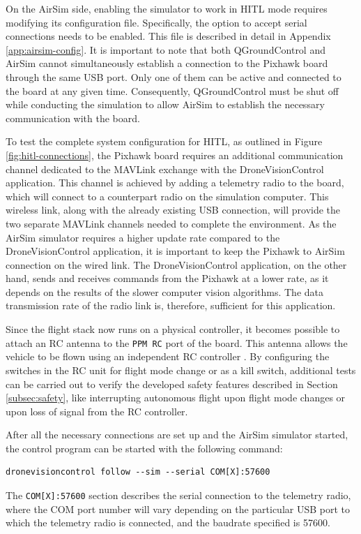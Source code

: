 On the AirSim side, enabling the simulator to work in HITL mode requires modifying its configuration file. Specifically, the option to accept serial connections needs to be enabled. This file is described in detail in Appendix \ref{app:airsim-config}.
It is important to note that both QGroundControl and AirSim cannot simultaneously establish a connection to the Pixhawk board through the same USB port. Only one of them can be active and connected to the board at any given time. Consequently, QGroundControl must be shut off while conducting the simulation to allow AirSim to establish the necessary communication with the board.


To test the complete system configuration for HITL, as outlined in Figure \ref{fig:hitl-connections}, the Pixhawk board requires an additional communication channel dedicated to the MAVLink exchange with the DroneVisionControl application. This channel is achieved by adding a telemetry radio to the board, which will connect to a counterpart radio on the simulation computer. This wireless link, along with the already existing USB connection, will provide the two separate MAVLink channels needed to complete the environment.
As the AirSim simulator requires a higher update rate compared to the DroneVisionControl application, it is important to keep the Pixhawk to AirSim connection on the wired link. The DroneVisionControl application, on the other hand, sends and receives commands from the Pixhawk at a lower rate, as it depends on the results of the slower computer vision algorithms. The data transmission rate of the radio link is, therefore, sufficient for this application.

Since the flight stack now runs on a physical controller, it becomes possible to attach an RC antenna to the \texttt{PPM RC} port of the board. This antenna allows the vehicle to be flown using an independent RC controller \cite{configure-rc}. By configuring the switches in the RC unit for flight mode change or as a kill switch, additional tests can be carried out to verify the developed safety features described in Section \ref{subsec:safety}, like interrupting autonomous flight upon flight mode changes or upon loss of signal from the RC controller.


After all the necessary connections are set up and the AirSim simulator started, the control program can be started with the following command:
\begin{verbatim}
dronevisioncontrol follow --sim --serial COM[X]:57600
\end{verbatim}
The \texttt{COM[X]:57600} section describes the serial connection to the telemetry radio, where the COM port number will vary depending on the particular USB port to which the telemetry radio is connected, and the baudrate specified is 57600.



